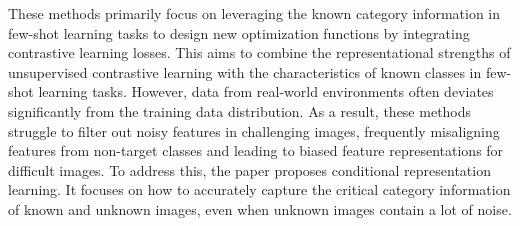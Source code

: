 

These methods primarily focus on leveraging the known category information in few-shot learning tasks to design new optimization functions by integrating contrastive learning losses. This aims to combine the representational strengths of unsupervised contrastive learning with the characteristics of known classes in few-shot learning tasks. {\color{recolor}However, data from real-world environments often deviates significantly from the training data distribution. As a result, these methods struggle to filter out noisy features in challenging images, frequently misaligning features from non-target classes and leading to biased feature representations for difficult images.}
To address this, the paper proposes conditional representation learning. It focuses on how to accurately capture the critical category information of known and unknown images, even when unknown images contain a lot of noise. 
